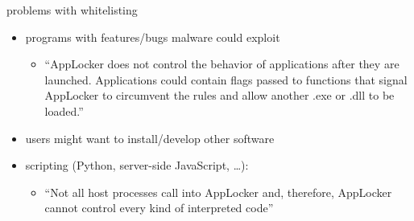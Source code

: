 \begin{frame}{problems with whitelisting}
    \begin{itemize}
    \item programs with features/bugs malware could exploit
        \begin{itemize}
        \item ``AppLocker does not control the behavior of applications after they are launched. Applications could contain flags passed to functions that signal AppLocker to circumvent the rules and allow another .exe or .dll to be loaded.''
        \end{itemize}
    \item users might want to install/develop other software
    \item scripting (Python, server-side JavaScript, \ldots):
        \begin{itemize}
        \item ``Not all host processes call into AppLocker and, therefore, AppLocker cannot control every kind of interpreted code''
        \end{itemize}
    \end{itemize}
\end{frame}
